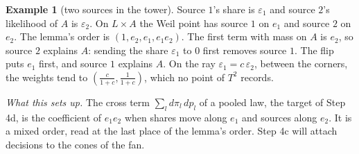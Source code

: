 \documentclass[11pt]{article}
\theoremstyle{definition}\newtheorem{definition}[theorem]{Definition}\newtheorem{remark}[theorem]{Remark}\newtheorem{example}[theorem]{Example}
\begin{document}
\begin{example}[two sources in the tower]\label{ex:tower2}
Source $1$'s share is $\varepsilon_1$ and source $2$'s likelihood of $A$ is $\varepsilon_2$. On $L\times A$ the Weil point has source $1$ on $e_1$ and
source $2$ on $e_2$. The lemma's order is $(1,e_2,e_1,e_1e_2)$. The first term with mass on $A$ is $e_2$, so source $2$ explains $A$: sending
the share $\varepsilon_1$ to $0$ first removes source $1$. The flip puts $e_1$ first, and source $1$ explains $A$. On the ray $\varepsilon_1=c\,\varepsilon_2$, between
the corners, the weights tend to $(\tfrac c{1+c},\tfrac1{1+c})$, which no point of $T^2$ records.
\end{example}

\begin{center}\small
{}
\end{center}

\emph{What this sets up.} The cross term $\sum_ld\pi_l\,dp_l$ of a pooled law, the target of Step 4d, is the coefficient of $e_1e_2$ when shares
move along $e_1$ and sources along $e_2$. It is a mixed order, read at the last place of the lemma's order. Step 4c will attach decisions
to the cones of the fan.
\end{document}
